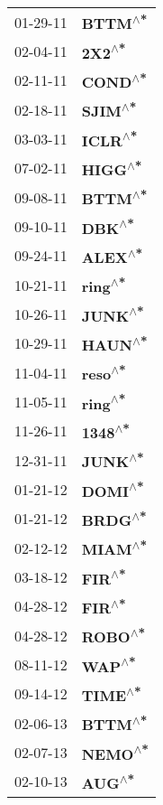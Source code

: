 \begin{supertabular}{p{0.08\textwidth}p{0.2\textwidth}}
 01-29-11 &   \textbf{BTTM\textsuperscript{$\wedge$*}} \\
 02-04-11 &    \textbf{2X2\textsuperscript{$\wedge$*}} \\
 02-11-11 &   \textbf{COND\textsuperscript{$\wedge$*}} \\
 02-18-11 &   \textbf{SJIM\textsuperscript{$\wedge$*}} \\
 03-03-11 &   \textbf{ICLR\textsuperscript{$\wedge$*}} \\
 07-02-11 &   \textbf{HIGG\textsuperscript{$\wedge$*}} \\
 09-08-11 &   \textbf{BTTM\textsuperscript{$\wedge$*}} \\
 09-10-11 &    \textbf{DBK\textsuperscript{$\wedge$*}} \\
 09-24-11 &   \textbf{ALEX\textsuperscript{$\wedge$*}} \\
 10-21-11 &   \textbf{ring\textsuperscript{$\wedge$*}} \\
 10-26-11 &   \textbf{JUNK\textsuperscript{$\wedge$*}} \\
 10-29-11 &   \textbf{HAUN\textsuperscript{$\wedge$*}} \\
 11-04-11 &   \textbf{reso\textsuperscript{$\wedge$*}} \\
 11-05-11 &   \textbf{ring\textsuperscript{$\wedge$*}} \\
 11-26-11 &   \textbf{1348\textsuperscript{$\wedge$*}} \\
 12-31-11 &   \textbf{JUNK\textsuperscript{$\wedge$*}} \\
 01-21-12 &   \textbf{DOMI\textsuperscript{$\wedge$*}} \\
 01-21-12 &   \textbf{BRDG\textsuperscript{$\wedge$*}} \\
 02-12-12 &   \textbf{MIAM\textsuperscript{$\wedge$*}} \\
 03-18-12 &    \textbf{FIR\textsuperscript{$\wedge$*}} \\
 04-28-12 &    \textbf{FIR\textsuperscript{$\wedge$*}} \\
 04-28-12 &   \textbf{ROBO\textsuperscript{$\wedge$*}} \\
 08-11-12 &    \textbf{WAP\textsuperscript{$\wedge$*}} \\
 09-14-12 &   \textbf{TIME\textsuperscript{$\wedge$*}} \\
 02-06-13 &   \textbf{BTTM\textsuperscript{$\wedge$*}} \\
 02-07-13 &   \textbf{NEMO\textsuperscript{$\wedge$*}} \\
 02-10-13 &    \textbf{AUG\textsuperscript{$\wedge$*}} \\

\end{supertabular}
